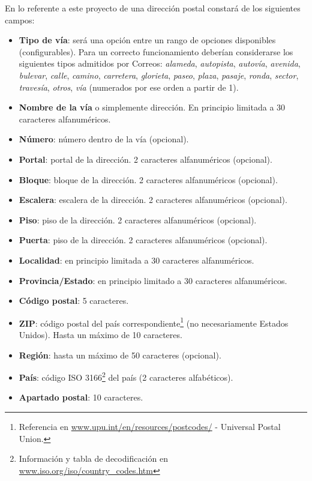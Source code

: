 \documentclass[11pt, a4paper, twoside, titlepage]{article}
\begin{document}
					\label{srs:direccionpostal}		
					En lo referente a este proyecto de \software una dirección postal constará de los siguientes campos:
					\begin{itemize}
						\item \textbf{Tipo de vía}: será una opción entre un rango de opciones disponibles (configurables). Para un correcto funcionamiento deberían considerarse los siguientes tipos admitidos por Correos: \textit{alameda}, \textit{autopista}, \textit{autovía}, \textit{avenida}, \textit{bulevar}, \textit{calle}, \textit{camino}, \textit{carretera}, \textit{glorieta}, \textit{paseo}, \textit{plaza}, \textit{pasaje}, \textit{ronda}, \textit{sector}, \textit{travesía}, \textit{otros}, \textit{vía} (numerados por ese orden a partir de 1).
						\item \textbf{Nombre de la vía} o simplemente dirección. En principio limitada a 30 caracteres alfanuméricos.
						\item \textbf{Número}: número dentro de la vía (opcional).
						\item \textbf{Portal}: portal de la dirección. 2 caracteres alfanuméricos (opcional).
						\item \textbf{Bloque}: bloque de la dirección. 2 caracteres alfanuméricos (opcional).
						\item \textbf{Escalera}: escalera de la dirección. 2 caracteres alfanuméricos (opcional).
						\item \textbf{Piso}: piso de la dirección. 2 caracteres alfanuméricos (opcional).
						\item \textbf{Puerta}: piso de la dirección. 2 caracteres alfanuméricos (opcional).
						\item \textbf{Localidad}: en principio limitada a 30 caracteres alfanuméricos.
						\item \textbf{Provincia/Estado}: en principio limitado a 30 caracteres alfanuméricos.
						\item \textbf{Código postal}: 5 caracteres.
						\item \textbf{ZIP}: código postal del país correspondiente\footnote{Referencia en \url{www.upu.int/en/resources/postcodes/} - Universal Postal Union.} (no necesariamente Estados Unidos). Hasta un máximo de 10 caracteres.
						\item \textbf{Región}: hasta un máximo de 50 caracteres (opcional).
						\item \textbf{País}: código ISO 3166\footnote{Información y tabla de decodificación en \url{www.iso.org/iso/country_codes.htm}} del país (2 caracteres alfabéticos).
						\item \textbf{Apartado postal}: 10 caracteres.
					\end{itemize}
\end{document}
